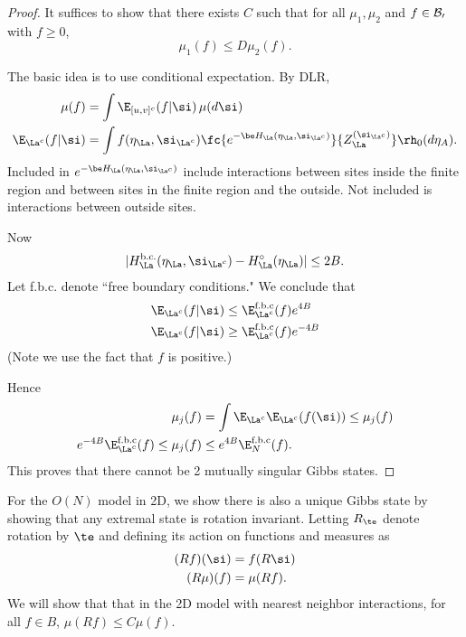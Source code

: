 \begin{proof}
It suffices to show that there exists $C$ such that for all $\mu_1,\mu_2$ and $f\in \cal B_0$ with $f\ge 0$, 
\[
\mu_1(f)\le D \mu_2(f).
\]


The basic idea is to use conditional expectation.  By DLR,
\begin{align}
\mu(f) &= \int \E_{[u,v]^c} (f|\si) \,\mu(d\si)\\
\E_{\La^c} (f|\si) &= \int f(\eta_\La, \si_{\La^c}) \fc{e^{-\be H_{\La}(\eta_\La, \si_{\La^c})}}{Z_{\La}^{(\si_{\La^c})}}\rh_0(d\eta_A).
\end{align}
Included in $e^{-\be H_{\La}(\eta_\La, \si_{\La^c})}$ include interactions between sites inside the finite region and between sites in the finite region and the outside. Not included is interactions between outside sites.

Now 
\[
|H_{\La}^{\text{b.c.}} (\eta_\La, \si_{\La^c}) - H_{\La}^{\circ} (\eta_\La)| \le 2B.
\]
Let f.b.c. denote ``free boundary conditions." 
We conclude that 
\begin{align}
\E_{\La^c}(f|\si)  &\le \E_{\La^c}^{\text{f.b.c}} (f) e^{4B}\\
\E_{\La^c}(f|\si)  &\ge \E_{\La^c}^{\text{f.b.c}} (f) e^{-4B}
\end{align}
(Note we use the fact that $f$ is positive.)

Hence
\begin{align}
\mu_j(f) &= \int \E_{\La^c} \E_{\La^c}(f(\si)) \le \mu_j(f) \\
e^{-4B} \E_{\La^c}^{\text{f.b.c}} (f) \le \mu_j(f) &\le e^{4B} \E_N^{\text{f.b.c}} (f).
\end{align}
This proves that there cannot be 2 mutually singular Gibbs states.
\end{proof}


For the $O(N)$ model in 2D, we show there is also a unique Gibbs state by showing that any extremal state is rotation invariant. Letting $R_\te$ denote rotation by $\te$ and defining its action on functions and measures as
\begin{align}
(Rf)(\si) &= f(R\si)\\
(R\mu)(f)&= \mu(Rf).
\end{align}
We will show that that in the 2D model with nearest neighbor interactions, for all $f\in B$, $\mu(Rf)\le C\mu(f)$.  


